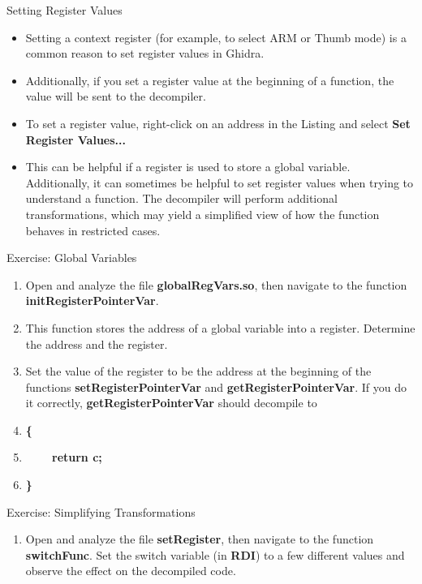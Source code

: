 \documentclass{beamer}
\begin{document}
\begin{frame}
\begin{block}{Setting Register Values}
\begin{itemize}
\item Setting a context register (for example, to select ARM or Thumb mode) is a common reason to set register values in Ghidra.
\item Additionally, if you set a register value at the beginning of a function, the value will be sent to the decompiler.
\item To set a register value, right-click on an address in the Listing and select \textbf{Set Register Values...}
\item This can be helpful if a register is used to store a global variable.  Additionally, it can sometimes be helpful to set register values when trying to 
understand a function.  The decompiler will perform additional transformations, which may yield a simplified view of how the function behaves in restricted cases.
\end{itemize}
\end{block}
\end{frame}

\begin{frame}
\begin{block}{Exercise: Global Variables}
\begin{enumerate}
\item Open and analyze the file \textbf{globalRegVars.so}, then navigate to the function \textbf{initRegisterPointerVar}.  
\item This function stores the address of a global variable into a register.  Determine the address and the register.
\item Set the value of the register to be the address at the beginning of the functions \textbf{setRegisterPointerVar} and \textbf{getRegisterPointerVar}. If you do it correctly,
\textbf{getRegisterPointerVar} should decompile to 
\item[]\textbf{\{}
\item[]\textbf{~~~~return c;}
\item[]\textbf{\}}
\end{enumerate}
\end{block}
\end{frame}

\begin{frame}
\begin{block}{Exercise: Simplifying Transformations}
\begin{enumerate}
\item Open and analyze the file \textbf{setRegister}, then navigate to the function \textbf{switchFunc}.  Set the switch variable (in \textbf{RDI}) to a few different values and
observe the effect on the decompiled code.
\end{enumerate}
\end{block}
\end{frame}
\end{document}
